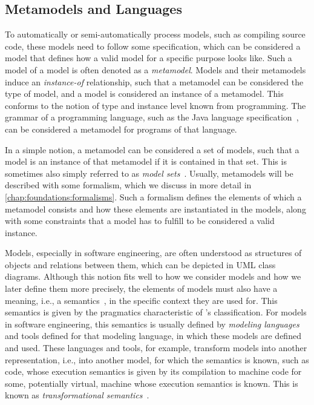 \subsection{Metamodels and Languages}
\label{chap:foundations:modeling:metamodels}

To automatically or semi-automatically process models, such as compiling source code, these models need to follow some specification, which can be considered a model that defines how a valid model for a specific purpose looks like.
Such a model of a model is often denoted as a \emph{metamodel}.
Models and their metamodels induce an \emph{instance-of} relationship, such that a metamodel can be considered the type of model, and a model is considered an instance of a metamodel.
This conforms to the notion of type and instance level known from programming.
The grammar of a programming language, such as the Java language specification~\cite{gosling2018jls-specification}, can be considered a metamodel for programs of that language.

In a simple notion, a metamodel can be considered a set of models, such that a model is an instance of that metamodel if it is contained in that set. This is sometimes also simply referred to as \emph{model sets}~\cite{stevens2020BidirectionalTransformationLarge-SoSym}.
Usually, metamodels will be described with some formalism, which we discuss in more detail in \autoref{chap:foundations:formalisms}.
Such a formalism defines the elements of which a metamodel consists and how these elements are instantiated in the models, along with some constraints that a model has to fulfill to be considered a valid instance.

Models, especially in software engineering, are often understood as structures of objects and relations between them, which can be depicted in \gls{UML} class diagrams.
Although this notion fits well to how we consider models and how we later define them more precisely, the elements of models must also have a meaning, i.e., a semantics~\cite{harel2004semantics-Computer}, in the specific context they are used for.
This semantics is given by the pragmatics characteristic of \citeauthor{stachowiak1973modelltheorie-Book}'s classification.
For models in software engineering, this semantics is usually defined by \emph{modeling languages} and tools defined for that modeling language, in which these models are defined and used.
These languages and tools, for example, transform models into another representation, i.e., into another model, for which the semantics is known, such as code, whose execution semantics is given by its compilation to machine code for some, potentially virtual, machine whose execution semantics is known.
This is known as \emph{transformational semantics}~\cite{pepper1987transformationalSemantics-SSPC}.

